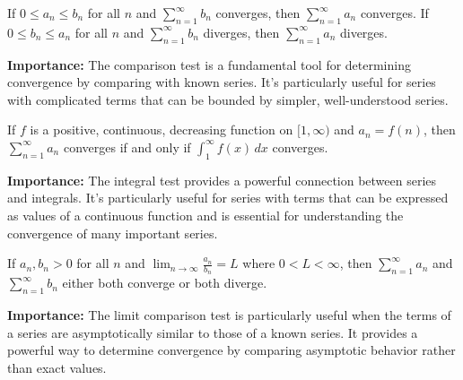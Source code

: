 \begin{theorem}
If $0 \leq a_n \leq b_n$ for all $n$ and $\sum_{n=1}^{\infty} b_n$ converges, then $\sum_{n=1}^{\infty} a_n$ converges. If $0 \leq b_n \leq a_n$ for all $n$ and $\sum_{n=1}^{\infty} b_n$ diverges, then $\sum_{n=1}^{\infty} a_n$ diverges.
\end{theorem}

\noindent\textbf{Importance:} The comparison test is a fundamental tool for determining convergence by comparing with known series. It's particularly useful for series with complicated terms that can be bounded by simpler, well-understood series.



\begin{theorem}
If $f$ is a positive, continuous, decreasing function on $[1, \infty)$ and $a_n = f(n)$, then $\sum_{n=1}^{\infty} a_n$ converges if and only if $\int_1^{\infty} f(x) \, dx$ converges.
\end{theorem}

\noindent\textbf{Importance:} The integral test provides a powerful connection between series and integrals. It's particularly useful for series with terms that can be expressed as values of a continuous function and is essential for understanding the convergence of many important series.



\begin{theorem}
If $a_n, b_n > 0$ for all $n$ and $\lim_{n \to \infty} \frac{a_n}{b_n} = L$ where $0 < L < \infty$, then $\sum_{n=1}^{\infty} a_n$ and $\sum_{n=1}^{\infty} b_n$ either both converge or both diverge.
\end{theorem}

\noindent\textbf{Importance:} The limit comparison test is particularly useful when the terms of a series are asymptotically similar to those of a known series. It provides a powerful way to determine convergence by comparing asymptotic behavior rather than exact values.




